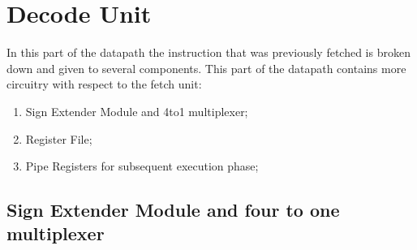 %
\chapter{Decode Unit}
\label{DecodeUnit}

In this part of the datapath the instruction that was previously fetched is broken down and given to several components.
This part of the datapath contains more circuitry with respect to the fetch unit:

\begin{enumerate}
    \item Sign Extender Module and 4to1 multiplexer;
    \item Register File;
    \item Pipe Registers for subsequent execution phase;
    \end{enumerate}

\section {Sign Extender Module and four to one multiplexer}

